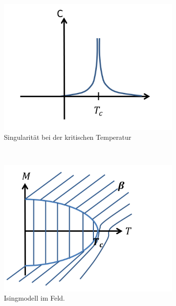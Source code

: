 \documentclass[12pt]{article}
\begin{document}
\begin{figure}[h] 
		\begin{subfigure}[h]{0.5 \textwidth}
		\centering
		\includegraphics[width=\textwidth]{Folie35.png}
		\caption{Singularität bei der kritischen Temperatur} 
		\label{fig:Singularity}
		\centering
	\end{subfigure}
	~
\begin{subfigure}[h]{0.5\textwidth}
		\centering
		\includegraphics[width=\textwidth]{Folie36.png}
		\caption{Isingmodell im Feld.}
		\label{fig:IsingmodellimFeld}
		\centering
	\end{subfigure}
	\caption{ }
\end{figure}	
\end{document}

